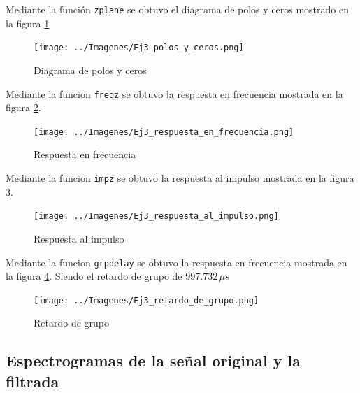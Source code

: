 \documentclass[10pt,spanish,a4paper,openany,notitlepage]{article}
\begin{document}
Mediante la función \texttt{zplane} se obtuvo el
diagrama de polos y ceros mostrado en la figura \ref{fig:polos_y_ceros} 

\begin{figure}[H] %
\begin{center}
\texttt{[image: ../Imagenes/Ej3\_polos\_y\_ceros.png]}
\caption{Diagrama de polos y ceros}
 \label{fig:polos_y_ceros}
\end{center}
\end{figure}

Mediante la funcion \texttt{freqz} se obtuvo la
respuesta en frecuencia mostrada en la figura \ref{fig:resp_frec}.

\begin{figure}[H] %
\begin{center}
\texttt{[image: ../Imagenes/Ej3\_respuesta\_en\_frecuencia.png]}
\caption{Respuesta en frecuencia}
 \label{fig:resp_frec}
\end{center}
\end{figure}

Mediante la funcion \texttt{impz} se obtuvo la
respuesta al impulso mostrada en la figura \ref{fig:resp_imp}.

\begin{figure}[H] %
\begin{center}
\texttt{[image: ../Imagenes/Ej3\_respuesta\_al\_impulso.png]}
\caption{Respuesta al impulso}
 \label{fig:resp_imp}
\end{center}
\end{figure}

Mediante la funcion \texttt{grpdelay} se obtuvo la
respuesta en frecuencia mostrada en la figura \ref{fig:retardo}.
Siendo el retardo de grupo de $997.732\, \unit{\mu s}$

\begin{figure}[H] %
\begin{center}
\texttt{[image: ../Imagenes/Ej3\_retardo\_de\_grupo.png]}
\caption{Retardo de grupo}
 \label{fig:retardo}
\end{center}
\end{figure}

\subsection{Espectrogramas de la señal original y la filtrada}
\end{document}
